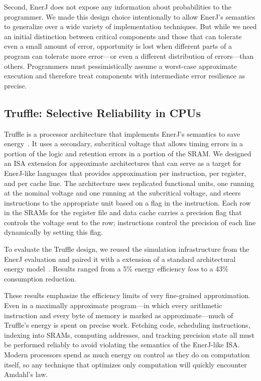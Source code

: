 Second, EnerJ does not expose any information about probabilities to the
programmer. We made this design choice intentionally to allow EnerJ's
semantics to generalize over a wide variety of implementation techniques. But
while we need an initial distinction between critical components and those
that can tolerate even a small amount of error, opportunity is lost when
different parts of a program can tolerate more error---or even a different
distribution of errors---than others. Programmers must pessimistically
assume a worst-case approximate execution and therefore treat components with
intermediate error resilience as precise.

\subsection{Truffle: Selective Reliability in CPUs}

Truffle is a processor architecture that implements EnerJ's semantics to save
energy~\cite{truffle}. It uses a secondary, subcritical voltage that allows timing errors in
a portion of the logic and retention errors in a portion of the SRAM.
We
designed an ISA extension for approximate architectures that can serve as a
target for EnerJ-like languages that provides approximation per instruction,
per register, and per cache line.
The architecture uses replicated functional units, one running at the nominal
voltage and one running at the subcritical voltage, and steers instructions to the
appropriate unit based on a flag in the instruction. Each row in the SRAMs for
the register file and data cache carries a precision flag that controls the
voltage sent to the row; instructions control the precision of each line
dynamically by setting this flag.

To evaluate the Truffle design,
we reused the simulation infrastructure from the EnerJ evaluation and paired
it with a extension of a standard architectural energy model~\cite{mcpat}.
Results ranged from a 5\% energy efficiency \emph{loss} to a 43\%
consumption reduction.

These results emphasize the efficiency limits of very fine-grained
approximation. Even in a maximally approximate program---in which every
arithmetic instruction and every byte of memory is marked as
approximate---much of Truffle's energy is spent on precise work. Fetching
code, scheduling instructions, indexing into SRAMs, computing addresses, and
tracking precision state all must be performed reliably to avoid violating
the semantics of the EnerJ-like ISA.
Modern processors spend as much energy on
control as they do on computation itself, so any technique that optimizes only
computation will quickly encounter Amdahl's law.

